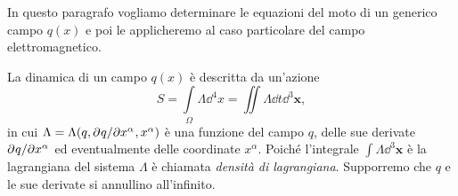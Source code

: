 In questo paragrafo vogliamo determinare le equazioni del moto di un generico
campo $q(x)$ e poi le applicheremo al caso particolare del campo
elettromagnetico.

La dinamica di un campo $q(x)$ è descritta da un'azione
\begin{equation}
  \label{eq:azione-campo}
  S = \int\limits_{\Omega} \Lambda\dd^{4} x = \iint \Lambda \dd t\dd^{3} \bm{x},
\end{equation}
in cui $\Lambda = \Lambda(q, \partial^{} q / \partial {x^{\alpha}}^{}, x^{\alpha})$ è una
funzione del campo $q$, delle sue derivate $\partial^{} q / \partial {x^{\alpha}}^{}$ ed
eventualmente delle coordinate $x^{\alpha}$.  Poiché l'integrale
$\int \Lambda\dd^{3} \bm{x}$ è la lagrangiana del sistema $\Lambda$ è chiamata
\emph{densità di lagrangiana}.  Supporremo che $q$ e le sue derivate si
annullino all'infinito.

